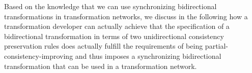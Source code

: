 Based on the knowledge that we can use synchronizing bidirectional transformations in transformation networks, we discuss in the following how a transformation developer can actually achieve that the specification of a bidirectional transformation in terms of two unidirectional consistency preservation rules does actually fulfill the requirements of being partial-consistency-improving and thus imposes a synchronizing bidirectional transformation that can be used in a transformation network.











